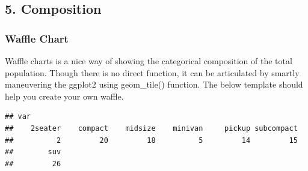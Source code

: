 \documentclass[a4paper]{article}
\newenvironment{Shaded}{}{}
\newcommand{\KeywordTok}[1]{\textcolor[rgb]{0.00,0.00,1.00}{#1}}
\newcommand{\DataTypeTok}[1]{#1}
\newcommand{\DecValTok}[1]{#1}
\newcommand{\StringTok}[1]{\textcolor[rgb]{0.00,0.50,0.50}{#1}}
\newcommand{\CommentTok}[1]{\textcolor[rgb]{0.00,0.50,0.00}{#1}}
\newcommand{\OperatorTok}[1]{#1}
\newcommand{\NormalTok}[1]{#1}
\begin{document}
\newpage

\subsection{5. Composition}\label{composition}

\subsubsection{Waffle Chart}\label{waffle-chart}

Waffle charts is a nice way of showing the categorical composition of
the total population. Though there is no direct function, it can be
articulated by smartly maneuvering the ggplot2 using geom\_tile()
function. The below template should help you create your own waffle.

\begin{Shaded}
\end{Shaded}

\begin{verbatim}
## var
##    2seater    compact    midsize    minivan     pickup subcompact 
##          2         20         18          5         14         15 
##        suv 
##         26
\end{verbatim}
\end{document}
